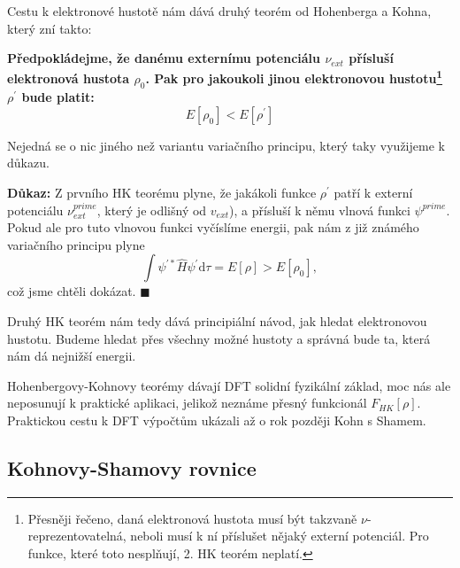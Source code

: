 Cestu k elektronové hustotě nám dává druhý teorém od Hohenberga a Kohna, který zní takto:

\bigskip
\textbf{Předpokládejme, že danému externímu potenciálu $\nu_{ext}$ přísluší elektronová hustota $\rho_0$. Pak pro jakoukoli jinou elektronovou hustotu\footnote{Přesněji řečeno, daná elektronová hustota musí být takzvaně $\nu$-{reprezentovatelná}, neboli musí k ní příslušet nějaký externí potenciál. Pro funkce, které toto nesplňují, 2. HK teorém neplatí.} $\rho^{\prime}$ bude platit:}
\begin{equation}
E[\rho_0] < E[\rho^{\prime}]
\label{rov:dft:HK2}
\end{equation}

Nejedná se o nic jiného než variantu variačního principu, který taky využijeme k důkazu.

\bigskip
\textbf{Důkaz:} Z prvního HK teorému plyne, že jakákoli funkce $\rho^{\prime}$ patří k externí potenciálu $\nu_{ext}^{prime}$, který je odlišný od $v_{ext}$), a přísluší k němu vlnová funkci $\psi^{prime}$. Pokud ale pro tuto vlnovou funkci vyčíslíme energii, pak nám z již známého variačního principu plyne
\begin{equation}
\int \psi^{\prime *} \hat{H} \psi^{\prime} \mathrm{d}\tau = E[\rho] > E [\rho_0],
\end{equation}
což jsme chtěli dokázat. \hfill {\footnotesize $\blacksquare$}

\bigskip
Druhý HK teorém nám tedy dává principiální návod, jak hledat elektronovou hustotu. Budeme hledat přes všechny možné hustoty a správná bude ta, která nám dá nejnižší energii.

Hohenbergovy-Kohnovy teorémy dávají DFT solidní fyzikální základ, moc nás ale neposunují k praktické aplikaci, jelikož neznáme přesný funkcionál $F_{HK}[\rho]$.
Praktickou cestu k DFT výpočtům ukázali až o rok později Kohn s Shamem.

\subsection{Kohnovy-Shamovy rovnice}

